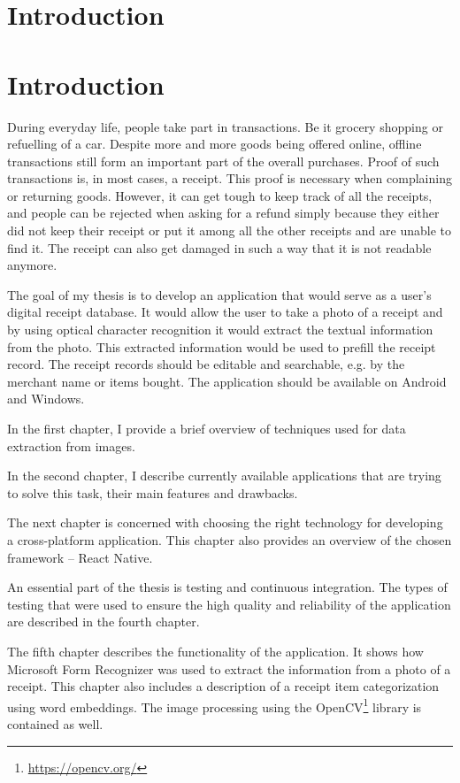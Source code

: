 \documentclass[
  digital, %
  table,   %
  oneside, %
  lof,     %
  lot,     %
]{fithesis3}
\begin{document}
\chapter*{Introduction}
\chapter*{Introduction}
During everyday life, people take part in transactions. Be it grocery shopping or refuelling of a car. Despite more and more goods being offered online, offline transactions still form an important part of the overall purchases. Proof of such transactions is, in most cases, a receipt. This proof is necessary when complaining or returning goods. However, it can get tough to keep track of all the receipts, and people can be rejected when asking for a refund simply because they either did not keep their receipt or put it among all the other receipts and are unable to find it. The receipt can also get damaged in such a way that it is not readable anymore. 

The goal of my thesis is to develop an application that would serve as a user's digital receipt database. It would allow the user to take a photo of a receipt and by using optical character recognition it would extract the textual information from the photo. This extracted information would be used to prefill the receipt record. The receipt records should be editable and searchable, e.g. by the merchant name or items bought. The application should be available on Android and Windows.

In the first chapter, I provide a brief overview of techniques used for data extraction from images.

In the second chapter, I describe currently available applications that are trying to solve this task, their main features and drawbacks.

The next chapter is concerned with choosing the right technology for developing a cross-platform application. This chapter also provides an overview of the chosen framework – React Native.

An essential part of the thesis is testing and continuous integration. The types of testing that were used to ensure the high quality and reliability of the application are described in the fourth chapter.

The fifth chapter describes the functionality of the application. It shows how Microsoft Form Recognizer \cite{WhatIsFormRecognizer} was used to extract the information from a photo of a receipt. This chapter also includes a description of a receipt item categorization using word embeddings. The image processing using the OpenCV\footnote{\url{https://opencv.org/}} library is contained as well.
\end{document}
